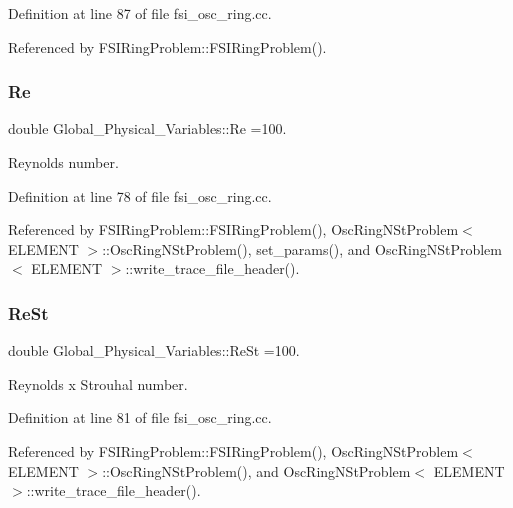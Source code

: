 Definition at line 87 of file fsi\+\_\+osc\+\_\+ring.\+cc.



Referenced by F\+S\+I\+Ring\+Problem\+::\+F\+S\+I\+Ring\+Problem().

\mbox{\label{namespaceGlobal__Physical__Variables_ab814e627d2eb5bc50318879d19ab16b9}} 
\subsubsection{\texorpdfstring{Re}{Re}}
{\footnotesize\ttfamily double Global\+\_\+\+Physical\+\_\+\+Variables\+::\+Re =100.}



Reynolds number. 



Definition at line 78 of file fsi\+\_\+osc\+\_\+ring.\+cc.



Referenced by F\+S\+I\+Ring\+Problem\+::\+F\+S\+I\+Ring\+Problem(), Osc\+Ring\+N\+St\+Problem$<$ E\+L\+E\+M\+E\+N\+T $>$\+::\+Osc\+Ring\+N\+St\+Problem(), set\+\_\+params(), and Osc\+Ring\+N\+St\+Problem$<$ E\+L\+E\+M\+E\+N\+T $>$\+::write\+\_\+trace\+\_\+file\+\_\+header().

\mbox{\label{namespaceGlobal__Physical__Variables_a085ee4bf968ffdd01a41b8c41864f907}} 
\subsubsection{\texorpdfstring{Re\+St}{ReSt}}
{\footnotesize\ttfamily double Global\+\_\+\+Physical\+\_\+\+Variables\+::\+Re\+St =100.}



Reynolds x Strouhal number. 



Definition at line 81 of file fsi\+\_\+osc\+\_\+ring.\+cc.



Referenced by F\+S\+I\+Ring\+Problem\+::\+F\+S\+I\+Ring\+Problem(), Osc\+Ring\+N\+St\+Problem$<$ E\+L\+E\+M\+E\+N\+T $>$\+::\+Osc\+Ring\+N\+St\+Problem(), and Osc\+Ring\+N\+St\+Problem$<$ E\+L\+E\+M\+E\+N\+T $>$\+::write\+\_\+trace\+\_\+file\+\_\+header().

